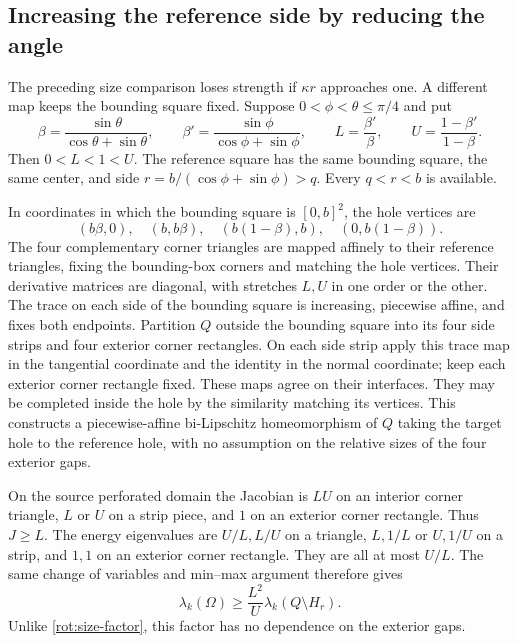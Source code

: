 \documentclass[11pt,reqno]{amsart}
\numberwithin{equation}{section}
\begin{document}
\subsection{Increasing the reference side by reducing the angle}
\label{rot:angle-transport}

The preceding size comparison loses strength if $\kappa r$ approaches
one. A different map keeps the bounding square fixed. Suppose
$0<\phi<\theta\leq\pi/4$ and put
\[
 \beta=\frac{\sin\theta}{\cos\theta+\sin\theta},\qquad
 \beta'=\frac{\sin\phi}{\cos\phi+\sin\phi},\qquad
 L=\frac{\beta'}{\beta},\qquad
 U=\frac{1-\beta'}{1-\beta}.
\]
Then $0<L<1<U$. The reference square has the same bounding square,
the same center, and side
$r=b/(\cos\phi+\sin\phi)>q$. Every $q<r<b$ is available.

In coordinates in which the bounding square is $[0,b]^2$, the hole
vertices are
\[
 (b\beta,0),\quad(b,b\beta),\quad
 (b(1-\beta),b),\quad(0,b(1-\beta)).
\]
The four complementary corner triangles are mapped affinely to their
reference triangles, fixing the bounding-box corners and matching the
hole vertices. Their derivative matrices are diagonal, with stretches
$L,U$ in one order or the other. The trace on each side of the bounding
square is increasing, piecewise affine, and fixes both endpoints.
Partition $Q$ outside the bounding square into its four side strips and
four exterior corner rectangles. On each side strip apply this trace
map in the tangential coordinate and the identity in the normal
coordinate; keep each exterior corner rectangle fixed. These maps
agree on their interfaces. They may be completed inside the hole by
the similarity matching its vertices. This constructs a piecewise-affine
bi-Lipschitz homeomorphism of $Q$ taking the target hole to the reference
hole, with no assumption on the relative sizes of the four exterior
gaps.

On the source perforated domain the Jacobian is $LU$ on an interior
corner triangle, $L$ or $U$ on a strip piece, and $1$ on an exterior
corner rectangle. Thus $J\geq L$. The energy eigenvalues are $U/L,L/U$
on a triangle, $L,1/L$ or $U,1/U$ on a strip, and $1,1$ on an exterior
corner rectangle. They are all at most $U/L$. The same change of
variables and min--max argument therefore gives
\begin{equation}\label{rot:angle-factor}
 \lambda_k(\Omega)\geq\frac{L^2}{U}
       \lambda_k(Q\setminus H_r).
\end{equation}
Unlike \eqref{rot:size-factor}, this factor has no dependence on the
exterior gaps.
\end{document}
